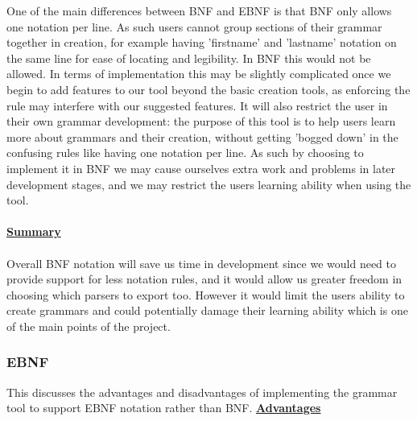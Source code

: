 One of the main differences between BNF and EBNF is that BNF only allows one notation per line. As such users cannot group sections of their grammar together in creation, for example having 'firstname' and 'lastname' notation on the same line for ease of locating and legibility. In BNF this would not be allowed. In terms of implementation this may be slightly complicated once we begin to add features to our tool beyond the basic creation tools, as enforcing the rule may interfere with our suggested features. It will also restrict the user in their own grammar development: the purpose of this tool is to help users learn more about grammars and their creation, without getting 'bogged down' in the confusing rules like having one notation per line. As such by choosing to implement it in BNF we may cause ourselves extra work and problems in later development stages, and we may restrict the users learning ability when using the tool. \\
\\
\textbf {\underline{Summary}}\\
\\
Overall BNF notation will save us time in development since we would need to provide support for less notation rules, and it would allow us greater freedom in choosing which parsers to export too. However it would limit the users ability to create grammars and could potentially damage their learning ability which is one of the main points of the project.

\subsubsection{EBNF}
This discusses the advantages and disadvantages of implementing the grammar tool to support EBNF notation rather than BNF. 
\textbf {\underline{Advantages}}

